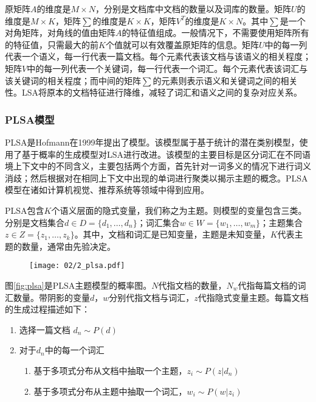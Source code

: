 原矩阵$A$的维度是$M \times N$，分别是文档库中文档的数量以及词库的数量。矩阵$U$的维度是$M \times K$，矩阵$\sum$的维度是$K \times K$，矩阵$V^T$的维度是$K \times N$。其中$\sum$是一个对角矩阵，对角线的值由矩阵$A$的特征值组成。一般情况下，不需要使用矩阵所有的特征值，只需最大的前$K$个值就可以有效覆盖原矩阵的信息。矩阵$U$中的每一列代表一个语义，每一行代表一篇文档。每个元素代表该文档与该语义的相关程度；矩阵$V$中的每一列代表一个关键词，每一行代表一个词汇。每个元素代表该词汇与该关键词的相关程度；而中间的矩阵$\sum$的元素则表示语义和关键词之间的相关性。LSA将原本的文档特征进行降维，减轻了词汇和语义之间的复杂对应关系。

\subsubsection{PLSA模型}
PLSA是Hofmann\cite{hofmann1999probabilistic}在1999年提出了模型。该模型属于基于统计的潜在类别模型，使用了基于概率的生成模型对LSA进行改进。该模型的主要目标是区分词汇在不同语境上下文中的不同含义，主要包括两个方面，首先针对一词多义的情况下进行词义消歧；然后根据对在相同上下文中出现的单词进行聚类以揭示主题的概念。PLSA模型在诸如计算机视觉、推荐系统等领域中得到应用。

PLSA包含$K$个语义层面的隐式变量，我们称之为主题。则模型的变量包含三类。分别是文档集合$d \in D = \{d_1, \dots, d_n\}$；词汇集合$w \in W = \{w_1, \dots, w_m\}$；主题集合$z \in Z = \{z_1, \dots, z_k\}$。其中，文档和词汇是已知变量，主题是未知变量，$K$代表主题的数量，通常由先验决定。

\begin{figure}
 \centering
 \texttt{[image: 02/2\_plsa.pdf]}
\end{figure}

图\ref{fig:plsa}是PLSA主题模型的概率图。$N$代指文档的数量，$N_w$代指每篇文档的词汇数量。带阴影的变量$d$，$w$分别代指文档与词汇，$z$代指隐式变量主题。每篇文档的生成过程描述如下：

\begin{enumerate}
\item 选择一篇文档 $d_n \sim P(d)$
\item 对于$d_n$中的每一个词汇
       \begin{enumerate}[fullwidth,itemindent=1em,label=(\alph*)]
       \item 基于多项式分布从文档中抽取一个主题，$z_i \sim P(z|d_n)$
       \item 基于多项式分布从主题中抽取一个词汇，$w_i \sim P(w|z_i)$
       \end{enumerate}
\end{enumerate}

